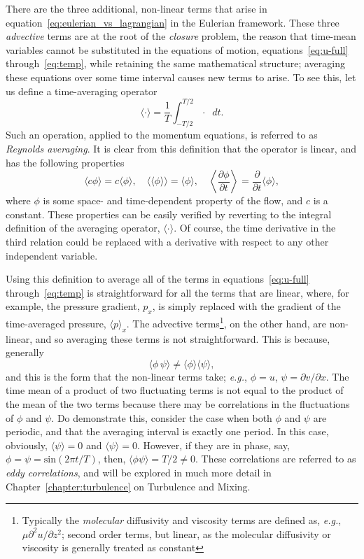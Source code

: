\documentclass[11pt]{report}
\numberwithin{equation}{section}
\begin{document}
There are the three additional, non-linear terms that arise in equation~\ref{eq:eulerian_vs_lagrangian} in the Eulerian framework.  These three {\it advective} terms are at the root of the {\it closure} problem, the reason that time-mean variables cannot be substituted in the equations of motion, equations~\ref{eq:u-full} through~\ref{eq:temp}, while retaining the same mathematical structure; averaging these equations over some time interval causes new terms to arise.  To see this, let us define a time-averaging operator
\begin{equation}
    \langle\cdot\rangle = \frac{1}{T} \int^{T/2}_{-T/2} \cdot\;\;dt.
\end{equation}
Such an operation, applied to the momentum equations, is referred to as {\it Reynolds averaging}.  It is clear from this definition that the operator is linear, and has the following properties
\begin{equation}
    \langle c \phi\rangle = c \langle\phi\rangle, \quad \langle\langle\phi\rangle\rangle = \langle\phi\rangle, \quad \left\langle\frac{\partial \phi}{\partial t}\right\rangle = \frac{\partial}{\partial t}\langle\phi\rangle,
\end{equation}
where $\phi$ is some space- and time-dependent property of the flow, and $c$ is a constant.  These properties can be easily verified by reverting to the integral definition of the averaging operator, $\langle\cdot\rangle$. Of course, the time derivative in the third relation could be replaced with a derivative with respect to any other independent variable.  

Using this definition to average all of the terms in equations~\ref{eq:u-full} through~\ref{eq:temp} is straightforward for all the terms that are linear, where, for example, the pressure gradient, $p_x$, is simply replaced with the gradient of the time-averaged pressure, $\langle p \rangle_x$.  The advective terms\footnote{Typically the {\it molecular} diffusivity and viscosity terms are defined as, \emph{e.g.}, $\mu \partial^2 u/\partial z^2$; second order terms, but linear, as the molecular diffusivity or viscosity is generally treated as constant}, on the other hand, are non-linear, and so averaging these terms is not straightforward.  This is because, generally
\begin{equation}
    \langle\phi\,\psi\rangle \ne \langle\phi\rangle\langle\psi\rangle,
\end{equation}
and this is the form that the non-linear terms take; \emph{e.g.}, $\phi=u$, $\psi=\partial v/\partial x$.  The time mean of a product of two fluctuating terms is not equal to the product of the mean of the two terms because there may be correlations in the fluctuations of $\phi$ and $\psi$.  Do demonstrate this, consider the case when both $\phi$ and $\psi$ are periodic, and that the averaging interval is exactly one period.  In this case, obviously, $\langle\psi\rangle=0$ and $\langle\psi\rangle=0$.  However, if they are in phase, say, $\phi=\psi=\mathrm{sin}(2 \pi t / T)$, then, $\langle\phi \psi\rangle = T/2 \ne 0$.  These correlations are referred to as {\it eddy correlations}, and will be explored in much more detail in Chapter~\ref{chapter:turbulence} on Turbulence and Mixing.
\end{document}
